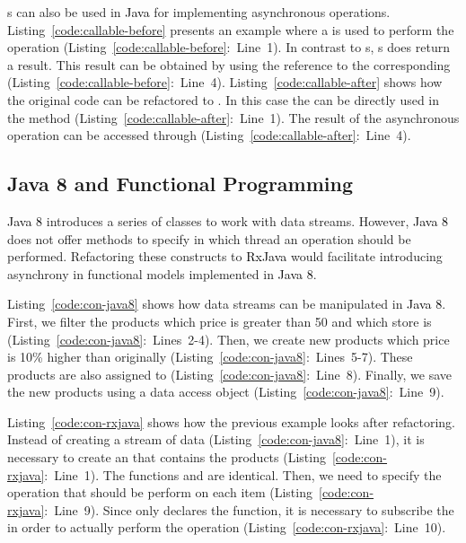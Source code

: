 \documentclass[type=bsc,accentcolor=tud9c]{tudthesis}
\newcommand{\framework}[1]{\textcolor{black}{#1}}
\begin{document}
s can also be used in \framework{Java} for implementing asynchronous operations. Listing~\ref{code:callable-before} presents an example where a  is used to perform the operation  (Listing~\ref{code:callable-before}:~Line~1). In contrast to s, s does return a result. This result can be obtained by using the reference to the corresponding  (Listing~\ref{code:callable-before}:~Line~4). Listing~\ref{code:callable-after} shows how the original code can be refactored to . In this case the  can be directly used in the  method (Listing~\ref{code:callable-after}:~Line~1). The result of the asynchronous operation can be accessed through  (Listing~\ref{code:callable-after}:~Line~4).



\subsection{Java 8 and Functional Programming}
\framework{Java 8} introduces a series of classes to work with data streams. However, \framework{Java 8} does not offer methods to specify in which thread an operation should be performed. Refactoring these constructs to \framework{RxJava} would facilitate introducing asynchrony in functional models implemented in \framework{Java 8}. 

Listing~\ref{code:con-java8} shows how data streams can be manipulated in \framework{Java 8}. First, we filter the products which price is greater than 50 and which store is  (Listing~\ref{code:con-java8}:~Lines~2-4). Then, we create new products which price is 10\% higher than originally (Listing~\ref{code:con-java8}:~Lines~5-7). These products are also assigned to  (Listing~\ref{code:con-java8}:~Line~8). Finally, we save the new products using a data access object (Listing~\ref{code:con-java8}:~Line~9).

Listing~\ref{code:con-rxjava} shows how the previous example looks after refactoring. Instead of creating a stream of data (Listing~\ref{code:con-java8}:~Line~1), it is necessary to create an  that contains the products (Listing~\ref{code:con-rxjava}:~Line~1). The functions  and  are identical. Then, we need to specify the operation that should be perform on each item (Listing~\ref{code:con-rxjava}:~Line~9). Since  only declares the function, it is necessary to subscribe the  in order to actually perform the operation (Listing~\ref{code:con-rxjava}:~Line~10).
\end{document}
